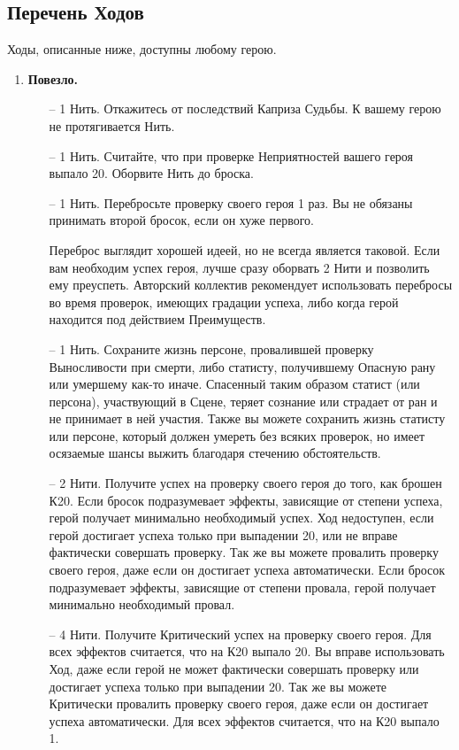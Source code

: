 \subsection{Перечень Ходов}
Ходы, описанные ниже, доступны любому герою. 
\begin{enumerate}
    \item \textbf{Повезло.}
    \begin{itemize}
        \item[--] 1 Нить. Откажитесь от последствий Каприза Судьбы. К вашему герою не протягивается Нить.
        \item[--] 1 Нить. Считайте, что при проверке Неприятностей вашего героя выпало 20. Оборвите Нить до броска.
        \item[--] 1 Нить. Перебросьте проверку своего героя 1 раз. Вы не обязаны принимать второй бросок, если он хуже первого.
        \begin{tcolorbox}
            Переброс выглядит хорошей идеей, но не всегда является таковой. Если вам необходим успех героя, лучше сразу оборвать 2 Нити и позволить ему преуспеть. Авторский коллектив рекомендует использовать перебросы во время проверок, имеющих градации успеха, либо когда герой находится под действием Преимуществ.
        \end{tcolorbox}
        \item[--] 1 Нить. Сохраните жизнь персоне, провалившей проверку Выносливости при смерти, либо статисту, получившему Опасную рану или умершему как-то иначе. Спасенный таким образом статист (или персона), участвующий в Сцене, теряет сознание или страдает от ран и не принимает в ней участия.
        \newline Также вы можете сохранить жизнь статисту или персоне, который должен умереть без всяких проверок, но имеет осязаемые шансы выжить благодаря стечению обстоятельств.
        \item[--] 2 Нити. Получите успех на проверку своего героя до того, как брошен К20. Если бросок подразумевает эффекты, зависящие от степени успеха, герой получает минимально необходимый успех. Ход недоступен, если герой достигает успеха только при выпадении 20, или не вправе фактически совершать проверку.
        \newline Так же вы можете провалить проверку своего героя, даже если он достигает успеха автоматически. Если бросок подразумевает эффекты, зависящие от степени провала, герой получает минимально необходимый провал.
        \item[--] 4 Нити. Получите Критический успех на проверку своего героя. Для всех эффектов считается, что на К20 выпало 20. Вы вправе использовать Ход, даже если герой не может фактически совершать проверку или достигает успеха только при выпадении 20.
        \newline Так же вы можете Критически провалить проверку своего героя, даже если он достигает успеха автоматически. Для всех эффектов считается, что на К20 выпало 1.
    \end{itemize}


\end{enumerate}
